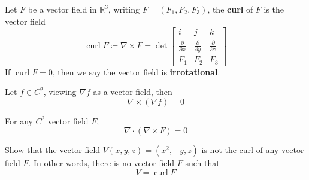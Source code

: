 \documentclass[openany]{book}
\newcommand{\R}{\mathbb{R}}
\newcommand{\curl}{\operatorname{curl}}
\begin{document}
\begin{defn}[curl]
    Let $F$ be a vector field in $\R^3$, writing $F=(F_1,F_2,F_3)$, the \textbf{curl} of $F$ is the vector field 
    \begin{equation*}
        \curl F\coloneq\nabla\times F=\det\begin{bmatrix}
            i&j&k\\
            \frac{\partial}{\partial x}&\frac{\partial}{\partial y}&\frac{\partial}{\partial z}\\
            F_1&F_2&F_3
        \end{bmatrix}
    \end{equation*}
    If $\curl F=0$, then we say the vector field is \textbf{irrotational}.
\end{defn}

\begin{prop}
    Let $f\in C^2$, viewing $\nabla f$ as a vector field, then
    \begin{equation*}
        \nabla\times(\nabla f)=0
    \end{equation*}    
\end{prop}

\begin{prop}
    For any $C^2$ vector field $F$, 
    \begin{equation*}
        \nabla\cdot(\nabla\times F)=0
    \end{equation*}
\end{prop}




\begin{prob}
    Show that the vector field $V(x,y,z)=(x^2, -y, z)$ is not the curl of any vector field $F$. In other words, there is no vector field $F$ such that 
    \begin{equation*}
        V=\curl F
    \end{equation*}
\end{prob}




\begin{prob}
    
\end{prob}
\end{document}
